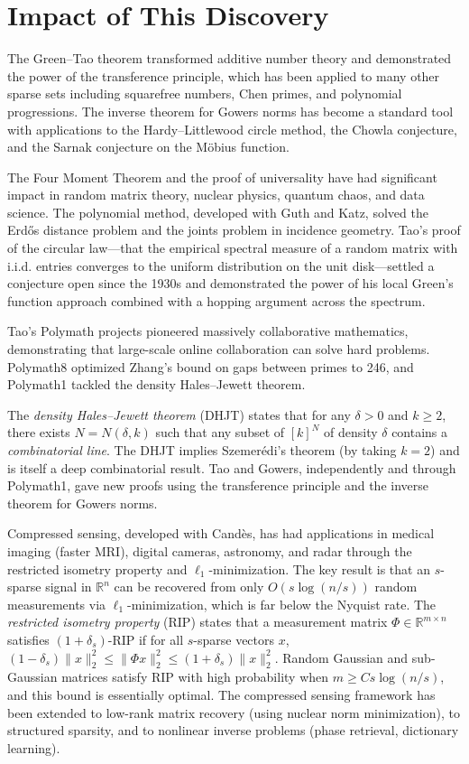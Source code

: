 \section{Impact of This Discovery}

The Green--Tao theorem transformed additive number theory and demonstrated the power of the transference principle, which has been applied to many other sparse sets including squarefree numbers, Chen primes, and polynomial progressions. The inverse theorem for Gowers norms has become a standard tool with applications to the Hardy--Littlewood circle method, the Chowla conjecture, and the Sarnak conjecture on the M\"obius function.

The Four Moment Theorem and the proof of universality have had significant impact in random matrix theory, nuclear physics, quantum chaos, and data science. The polynomial method, developed with Guth and Katz, solved the Erd\H{o}s distance problem and the joints problem in incidence geometry. Tao's proof of the circular law---that the empirical spectral measure of a random matrix with i.i.d. entries converges to the uniform distribution on the unit disk---settled a conjecture open since the 1930s and demonstrated the power of his local Green's function approach combined with a hopping argument across the spectrum.

Tao's Polymath projects pioneered massively collaborative mathematics, demonstrating that large-scale online collaboration can solve hard problems. Polymath8 optimized Zhang's bound on gaps between primes to 246, and Polymath1 tackled the density Hales--Jewett theorem.

The \emph{density Hales--Jewett theorem} (DHJT) states that for any $\delta > 0$ and $k \ge 2$, there exists $N = N(\delta, k)$ such that any subset of $[k]^N$ of density $\delta$ contains a \emph{combinatorial line}. The DHJT implies Szemer\'edi's theorem (by taking $k=2$) and is itself a deep combinatorial result. Tao and Gowers, independently and through Polymath1, gave new proofs using the transference principle and the inverse theorem for Gowers norms.

Compressed sensing, developed with Cand\`es, has had applications in medical imaging (faster MRI), digital cameras, astronomy, and radar through the restricted isometry property and $\ell_1$-minimization. The key result is that an $s$-sparse signal in $\mathbb{R}^n$ can be recovered from only $O(s \log(n/s))$ random measurements via $\ell_1$-minimization, which is far below the Nyquist rate. The \emph{restricted isometry property} (RIP) states that a measurement matrix $\Phi \in \mathbb{R}^{m \times n}$ satisfies $(1+\delta_s)$-RIP if for all $s$-sparse vectors $x$, $(1-\delta_s)\|x\|_2^2 \le \|\Phi x\|_2^2 \le (1+\delta_s)\|x\|_2^2$. Random Gaussian and sub-Gaussian matrices satisfy RIP with high probability when $m \ge C s \log(n/s)$, and this bound is essentially optimal. The compressed sensing framework has been extended to low-rank matrix recovery (using nuclear norm minimization), to structured sparsity, and to nonlinear inverse problems (phase retrieval, dictionary learning).

